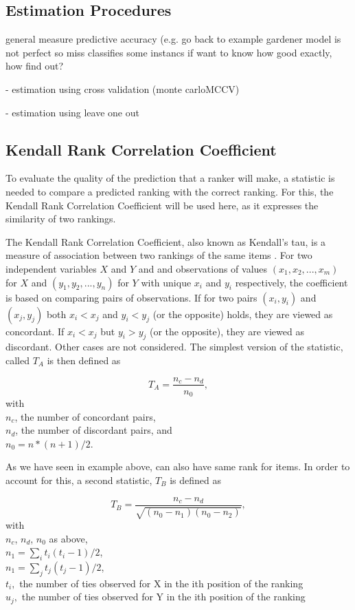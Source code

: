 \subsection{Estimation Procedures}

general measure predictive accuracy (e.g. go back to example gardener model is not perfect so miss classifies some instancs if want to know how good exactly, how find out?

- estimation using cross validation (monte carloMCCV)

- estimation using leave one out

\subsection{Kendall Rank Correlation Coefficient}
To evaluate the quality of the prediction that a ranker will make, a statistic is needed to compare a predicted ranking with the correct ranking. For this, the Kendall Rank Correlation Coefficient will be used here, as it expresses the similarity of two rankings.

The Kendall Rank Correlation Coefficient, also known as Kendall's tau, is a measure of association between two rankings of the same items \cite{kendall1938new}. For two independent variables $X$ and $Y$ and and observations of values $(x_1,x_2,...,x_m)$ for $X$ and $(y_1,y_2,...,y_n)$ for $Y$ with unique $x_i$ and $y_i$ respectively, the coefficient is based on comparing pairs of observations. If for two pairs $(x_i,y_i)$ and $(x_j,y_j)$ both $x_i < x_j$ and $y_i < y_j$ (or the opposite) holds, they are viewed as concordant. If $x_i < x_j$ but $y_i > y_j$ (or the opposite), they are viewed as discordant. Other cases are not considered. The simplest version of the statistic, called $T_A$ is then defined as 

$$T_A = \frac{n_c - n_d}{n_0},$$
with \\
$n_c$, the number of concordant pairs, \\
$n_d$, the number of discordant pairs, and \\
$n_0 = n * (n + 1) / 2$.

As we have seen in example above, can also have same rank for items. In order to account for this, a second statistic, $T_B$ is defined as

$$T_B = \frac{n_c - n_d}{\sqrt{(n_0 - n_1 )(n_0 - n_2 )}},$$
with \\
$n_c$, $n_d$, $n_0$ as above, \\
$n_1=\sum_i{t_i(t_i-1)/2}$, \\
$n_1=\sum_j{t_j(t_j-1)/2}$, \\
$t_i,$ the number of ties observed for X in the ith position of the ranking \\
$u_j,$ the number of ties observed for Y in the ith position of the ranking 


